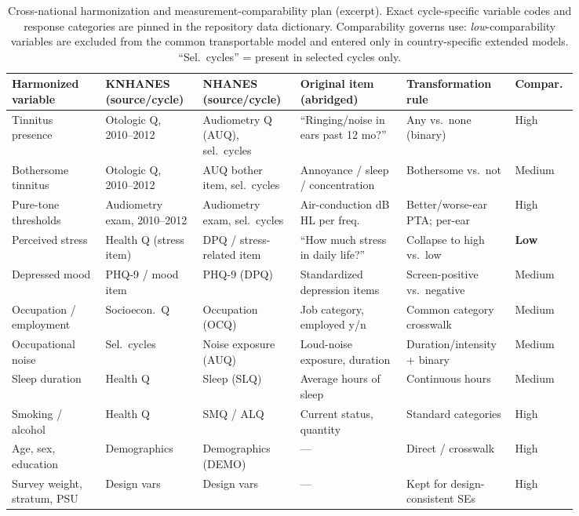 \begin{table}[htbp]
\centering
\caption{Cross-national harmonization and measurement-comparability plan (excerpt). Exact cycle-specific variable codes and response categories are pinned in the repository data dictionary. Comparability governs use: \emph{low}-comparability variables are excluded from the common transportable model and entered only in country-specific extended models. ``Sel.\ cycles'' = present in selected cycles only.}
\label{tab:harmonization}
\scriptsize
\begin{tabular}{p{0.155\linewidth}p{0.145\linewidth}p{0.145\linewidth}p{0.175\linewidth}p{0.135\linewidth}p{0.085\linewidth}}
\toprule
Harmonized variable & KNHANES (source/cycle) & NHANES (source/cycle) & Original item (abridged) & Transformation rule & Compar. \\
\midrule
Tinnitus presence & Otologic Q, 2010--2012 & Audiometry Q (AUQ), sel.\ cycles & ``Ringing/noise in ears past 12 mo?'' & Any vs.\ none (binary) & High \\
Bothersome tinnitus & Otologic Q, 2010--2012 & AUQ bother item, sel.\ cycles & Annoyance / sleep / concentration & Bothersome vs.\ not & Medium \\
Pure-tone thresholds & Audiometry exam, 2010--2012 & Audiometry exam, sel.\ cycles & Air-conduction dB HL per freq. & Better/worse-ear PTA; per-ear & High \\
Perceived stress & Health Q (stress item) & DPQ / stress-related item & ``How much stress in daily life?'' & Collapse to high vs.\ low & \textbf{Low} \\
Depressed mood & PHQ-9 / mood item & PHQ-9 (DPQ) & Standardized depression items & Screen-positive vs.\ negative & Medium \\
Occupation / employment & Socioecon.\ Q & Occupation (OCQ) & Job category, employed y/n & Common category crosswalk & Medium \\
Occupational noise & Sel.\ cycles & Noise exposure (AUQ) & Loud-noise exposure, duration & Duration/intensity + binary & Medium \\
Sleep duration & Health Q & Sleep (SLQ) & Average hours of sleep & Continuous hours & Medium \\
Smoking / alcohol & Health Q & SMQ / ALQ & Current status, quantity & Standard categories & High \\
Age, sex, education & Demographics & Demographics (DEMO) & --- & Direct / crosswalk & High \\
Survey weight, stratum, PSU & Design vars & Design vars & --- & Kept for design-consistent SEs & High \\
\bottomrule
\end{tabular}
\end{table}

